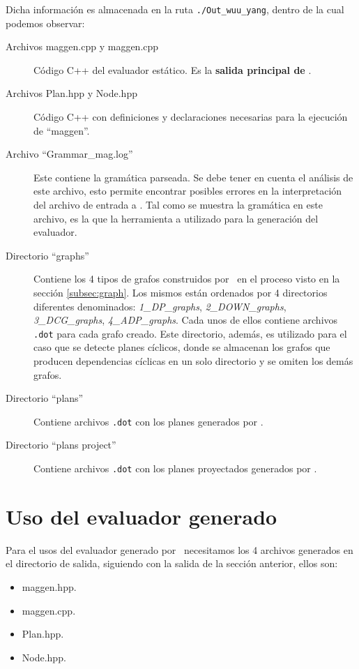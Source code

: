 Dicha información es almacenada en la ruta \texttt{./Out\_wuu\_yang}, dentro de la cual podemos observar:

\begin{description}
\item [Archivos maggen.cpp y maggen.cpp] Código C++ del evaluador estático. Es la \textbf{salida principal de} \maggen.

\item [Archivos Plan.hpp y Node.hpp] Código C++ con definiciones y declaraciones necesarias para la ejecución de ``maggen''.

\item [Archivo ``Grammar\_mag.log''] Este contiene la gramática parseada. Se debe tener en cuenta el análisis de este archivo, esto permite encontrar posibles errores en la interpretación del archivo de entrada a \maggen. Tal como se muestra la gramática en este archivo, es la que la herramienta a utilizado para la generación del evaluador.

\item [Directorio ``graphs''] Contiene los 4 tipos de grafos construidos por \maggen\ en el proceso visto en la sección \ref{subsec:graph}. Los mismos están ordenados por 4 directorios diferentes denominados: \textit{1\_DP\_graphs}, \textit{2\_DOWN\_graphs}, \textit{3\_DCG\_graphs}, \textit{4\_ADP\_graphs}. Cada unos de ellos contiene archivos \texttt{.dot} para cada grafo creado. Este directorio, además, es utilizado para el caso que se detecte planes cíclicos, donde se almacenan los grafos que producen dependencias cíclicas en un solo directorio y se omiten los demás grafos.

\item [Directorio ``plans''] Contiene archivos \texttt{.dot} con los planes generados por \maggen.

\item [Directorio ``plans project''] Contiene archivos \texttt{.dot} con los planes proyectados generados por \maggen.
\end{description}

\section{Uso del evaluador generado}

Para el usos del evaluador generado por \maggen\ necesitamos los 4 archivos generados en el directorio de salida, siguiendo con la salida de la sección anterior, ellos son:
\begin{itemize}
\item maggen.hpp.
\item maggen.cpp.
\item Plan.hpp.
\item Node.hpp.
\end{itemize}

